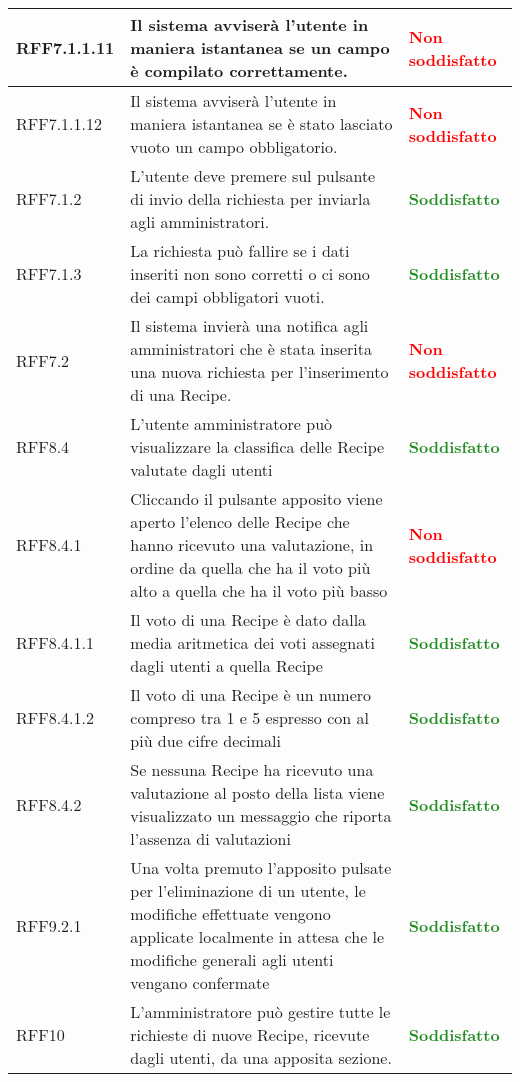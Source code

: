 \begin{center}
\begin{longtable}{| p{2.5cm} | p{8cm} | p{3.5cm} |}
		\hline
		RFF7.1.1.11 & Il sistema avviserà l'utente in maniera istantanea se un campo è compilato correttamente. & \textbf{\textcolor{red}{Non soddisfatto}} \\
		\hline
		RFF7.1.1.12 & Il sistema avviserà l'utente in maniera istantanea se è stato lasciato vuoto un campo obbligatorio. & \textbf{\textcolor{red}{Non soddisfatto}} \\
		\hline
		RFF7.1.2 & L'utente deve premere sul pulsante di invio della richiesta per inviarla agli amministratori. & \textbf{\textcolor{forestgreen}{Soddisfatto}}  \\
		\hline
		RFF7.1.3 & La richiesta può fallire se i dati inseriti non sono corretti o ci sono dei campi obbligatori vuoti. & \textbf{\textcolor{forestgreen}{Soddisfatto}}  \\
		\hline
		RFF7.2  & Il sistema invierà una notifica agli amministratori che è stata inserita una nuova richiesta per l'inserimento di una Recipe. & \textbf{\textcolor{red}{Non soddisfatto}} \\
		\hline
		RFF8.4 & L'utente amministratore può visualizzare la classifica delle Recipe valutate dagli utenti  & \textbf{\textcolor{forestgreen}{Soddisfatto}}  \\
		\hline
		RFF8.4.1 & Cliccando il pulsante apposito viene aperto l'elenco delle Recipe che hanno ricevuto una valutazione, in ordine da quella che ha il voto più alto a quella che ha il voto più basso  & \textbf{\textcolor{red}{Non soddisfatto}}  \\
		\hline
		RFF8.4.1.1 & Il voto di una Recipe è dato dalla media aritmetica dei voti assegnati dagli utenti a quella Recipe  & \textbf{\textcolor{forestgreen}{Soddisfatto}}  \\
		\hline
		RFF8.4.1.2 & Il voto di una Recipe è un numero compreso tra 1 e 5 espresso con al più due cifre decimali  &  \textbf{\textcolor{forestgreen}{Soddisfatto}}  \\
		\hline
		RFF8.4.2 & Se nessuna Recipe ha ricevuto una valutazione al posto della lista viene visualizzato un messaggio che riporta l'assenza di valutazioni  & \textbf{\textcolor{forestgreen}{Soddisfatto}}  \\
		\hline
		RFF9.2.1  &  Una volta premuto l'apposito pulsate per l'eliminazione di un utente, le modifiche effettuate vengono applicate localmente in attesa che le modifiche generali agli utenti vengano confermate  &  \textbf{\textcolor{forestgreen}{Soddisfatto}} \\
		\hline
		RFF10  &  L'amministratore può gestire tutte le richieste di nuove Recipe, ricevute dagli utenti, da una apposita sezione.  & \textbf{\textcolor{forestgreen}{Soddisfatto}} \\

\end{longtable}
\end{center}
